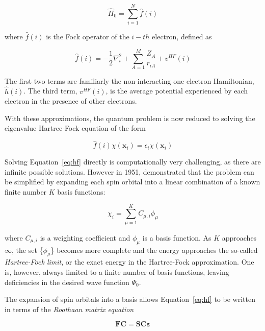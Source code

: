 \begin{equation}
\hat{H}_0 = \sum_{i=1}^N \hat{f}(i)
\end{equation}

\noindent where $\hat{f}(i)$ is the Fock operator of the $i-th$ electron,
defined as

\begin{equation}
  \hat{f}(i) = -\frac{1}{2}\nabla^2_i + \sum_{A=1}^M\frac{Z_A}{r_{iA}} + v^{HF}(i)
\end{equation}

\noindent The first two terms are familiarly the non-interacting one electron
Hamiltonian, $\hat{h}(i)$. The third term, $v^{HF}(i)$, is the average
potential experienced by each electron in the presence of other electrons.

With these approximations, the quantum problem is now reduced to solving the
eigenvalue Hartree-Fock equation of the form

\begin{equation}
\hat{f}(i)\chi(\mathbf{x}_i) = \epsilon_i\chi(\mathbf{x}_i)
\label{eq:hf}
\end{equation}

Solving Equation~\ref{eq:hf} directly is computationally very challenging, as
there are infinite possible solutions.  However in 1951, \citet{Roothaan1951}
demonstrated that the problem can be simplified by expanding each spin orbital
into a linear combination of a known finite number $K$ basis functions:

\begin{equation}
\chi_i = \sum_{\mu=1}^K C_{\mu,i}\phi_{\mu}
\end{equation}

\noindent where $C_{\mu,i}$ is a weighting coefficient and $\phi_{\mu}$ is a
basis function. As $K$ approaches $\infty$, the set \{$\phi_{\mu}$\} becomes
more complete and the energy approaches the so-called \emph{Hartree-Fock
limit}, or the exact energy in the Hartree-Fock approximation. One is, however,
always limited to a finite number of basis functions, leaving deficiencies in
the desired wave function $\Psi_0$.

The expansion of spin orbitals into a basis allows Equation~\ref{eq:hf} to be
written in terms of the \emph{Roothaan matrix equation}

\begin{equation}
\mathbf{F}\mathbf{C} = \mathbf{S}\mathbf{C}\mathbf{\varepsilon}
\label{eq:roothan}
\end{equation}

